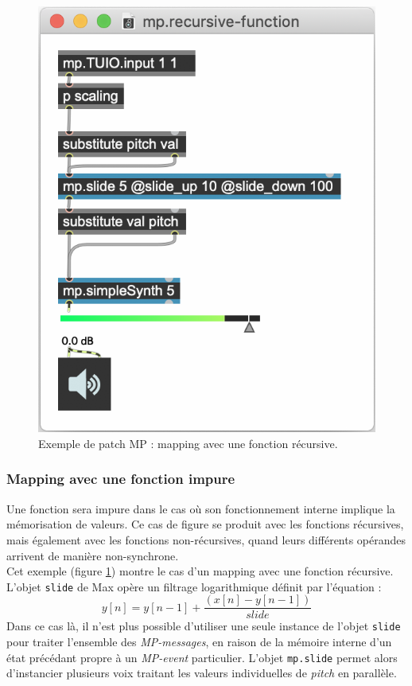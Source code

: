 \begin{figure}[!htbp]
\begin{minipage}[t]{0.485\textwidth}
	  	\includegraphics[width=\linewidth]{gfx/04_algorithms/MP-mappingRecursive.png}
		\caption[Exemple de patch MP : fonction récursive]{Exemple de patch MP : mapping avec une fonction récursive.}
		\label{fig:algorithms:MP-recursive}
	\end{minipage}
\end{figure}

\subsubsection{Mapping avec une fonction impure}

\noindent Une fonction sera impure dans le cas où son fonctionnement interne implique la mémorisation de valeurs. Ce cas de figure se produit avec les fonctions récursives, mais également avec les fonctions non-récursives, quand leurs différents opérandes arrivent de manière non-synchrone.\\
\indent Cet exemple (figure \ref{fig:algorithms:MP-recursive}) montre le cas d'un mapping avec une fonction récursive. L'objet \verb|slide| de Max opère un filtrage logarithmique définit par l'équation :
 $$y[n] = y[n-1] + \frac{(x[n]-y[n-1])}{slide}$$ 
\noindent Dans ce cas là, il n'est plus possible d'utiliser une seule instance de l'objet \verb|slide| pour traiter l'ensemble des \textit{MP-messages}, en raison de la mémoire interne d'un état précédant propre à un \textit{MP-event} particulier. L'objet \verb|mp.slide| permet alors d'instancier plusieurs voix traitant les valeurs individuelles de \textit{pitch} en parallèle.


